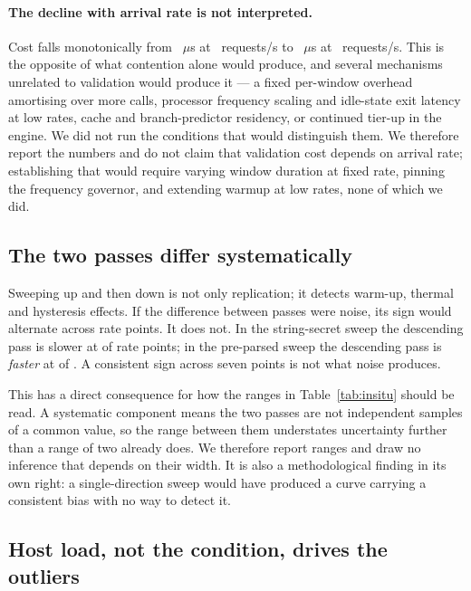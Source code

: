 \documentclass[pdflatex,sn-basic,twocolumn]{sn-jnl}%
\begin{document}
\paragraph{The decline with arrival rate is not interpreted.} Cost falls
monotonically from \InsituStringAscA~$\mu$s at \InsituRateA~requests/s to
\InsituStringAscG~$\mu$s at \InsituRateG~requests/s. This is the opposite of what
contention alone would produce, and several mechanisms unrelated to validation
would produce it --- a fixed per-window overhead amortising over more calls,
processor frequency scaling and idle-state exit latency at low rates, cache and
branch-predictor residency, or continued tier-up in the engine. We did not run
the conditions that would distinguish them. We therefore report the numbers and
do not claim that validation cost depends on arrival rate; establishing that
would require varying window duration at fixed rate, pinning the frequency
governor, and extending warmup at low rates, none of which we did.

\subsection{The two passes differ systematically}\label{sec:drift}

Sweeping up and then down is not only replication; it detects warm-up, thermal
and hysteresis effects. If the difference between passes were noise, its sign
would alternate across rate points. It does not. In the string-secret sweep the
descending pass is slower at \InsituStringSameSign{} of \InsituStringPoints{}
rate points; in the pre-parsed sweep the descending pass is \emph{faster} at
\InsituPreparsedSameSign{} of \InsituPreparsedPoints. A consistent sign across
seven points is not what noise produces.

This has a direct consequence for how the ranges in Table~\ref{tab:insitu} should
be read. A systematic component means the two passes are not independent samples
of a common value, so the range between them understates uncertainty further than
a range of two already does. We therefore report ranges and draw no inference that
depends on their width. It is also a methodological finding in its own right: a
single-direction sweep would have produced a curve carrying a consistent bias with
no way to detect it.

\subsection{Host load, not the condition, drives the outliers}\label{sec:load}
\end{document}
